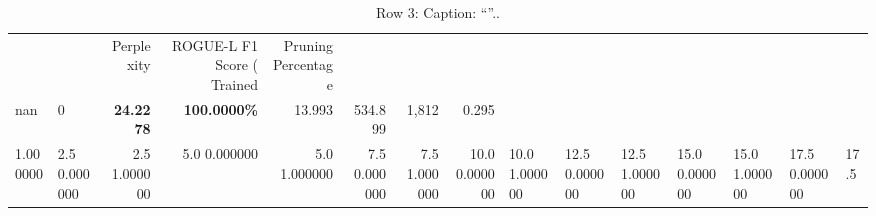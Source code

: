\begin{table}
\caption{Row 3\ifshowcaption{}: Caption: ``''.\else.\fi}
\label{tab:evaluation-pipeline-3}
\begin{tabular}{llrrrrrr}
 &  & Perplexity & ROGUE-L F1 Score (%
Trained & Pruning Percentage &  &  &  &  &  &  \\
nan & 0 & \bfseries 24.2278 & \bfseries 100.0000\% & 13.993 & 534.899 & 1,812 & 0.295 \\
1.000000 & 2.5%
0.000000 & 2.5%
1.000000 & 5.0%
0.000000 & 5.0%
1.000000 & 7.5%
0.000000 & 7.5%
1.000000 & 10.0%
0.000000 & 10.0%
1.000000 & 12.5%
0.000000 & 12.5%
1.000000 & 15.0%
0.000000 & 15.0%
1.000000 & 17.5%
0.000000 & 17.5%

\end{tabular}
\end{table}
